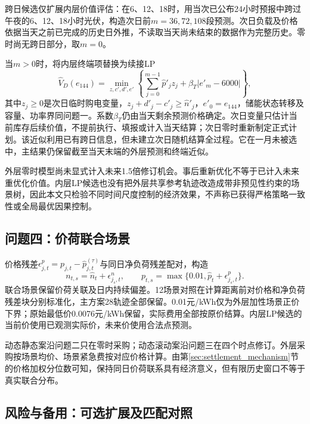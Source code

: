 跨日候选仅扩展内层价值评估：在6、12、18时，用当次已公布24小时预报中跨过午夜的6、12、18小时光伏，构造次日前$m=36,72,108$段预测。次日负载及价格依据当天之前已完成的历史日外推，不读取当天尚未结束的数据作为完整历史。零时尚无跨日部分，取$m=0$。

当$m>0$时，将内层终端项替换为续接LP
\begin{equation}
 \widehat V_D(e_{144})=\min_{z,c',d',e'}
 \left\{\sum_{j=0}^{m-1}\widehat p'_jz_j+\beta_T|e'_m-6000|\right\},
 \label{eq:v2_continuation}
\end{equation}
其中$z_j\ge0$是次日临时购电变量，$z_j+d'_j-c'_j\ge\widehat n'_j$，$e'_0=e_{144}$，储能状态转移及容量、功率界同问题一。系数$\beta_T$仍由当天剩余预测价格确定。次日变量只估计当前库存后续价值，不提前执行、填报或计入当天结算；次日零时重新制定正式计划。该近似利用已有跨日信息，但未建立次日随机结算全过程。它在一月未被选中，主结果仍保留截至当天末端的外层预测和终端近似。

外层零时模型尚未显式计入未来1.5倍修订机会。事后重新优化不等于已计入未来重优化价值。内层LP候选也没有把外层共享参考轨迹改造成带非预见性约束的场景树，因此本文只检验不同时间尺度控制的经济效果，不声称已获得严格策略一致性或全局最优因果控制。

\subsection{问题四：价荷联合场景}

价格残差$\epsilon^p_{j,t}=p_{j,t}-\widehat p^{(\tau)}_{j,t}$与同日净负荷残差配对，构造
\begin{equation}
 n_{t,s}=\widehat n_t+\epsilon^n_{j_s,t},\qquad
 p_{t,s}=\max\{0.01,\widehat p_t+\epsilon^p_{j_s,t}\}.
 \label{eq:joint_scenario}
\end{equation}
联合场景保留价荷关联及日内持续偏差。12场景对照在计算距离前对价格和净负荷残差块分别标准化，主方案28轨迹全部保留。0.01元/kWh仅为外层加性场景正价下界；原始最低价0.0076元/kWh保留，实际费用全部按原价结算。内层LP候选的当前价使用已观测实际价，未来价使用合法点预测。

动态静态案沿问题二只在零时采购；动态滚动案沿问题三在四个时点修订。外层采购按场景均价、场景紧急费按对应价格计算。由第\ref{sec:settlement_mechanism}节的价格加权分位数可知，保持同日价荷联系具有经济意义，但有限历史窗口不等于真实联合分布。

\subsection{风险与备用：可选扩展及匹配对照}

